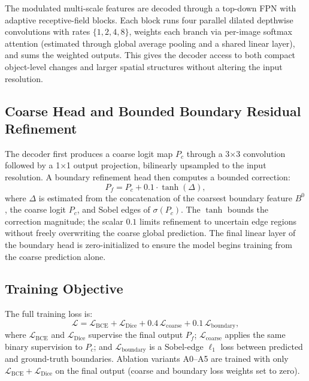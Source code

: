 The modulated multi-scale features are decoded through a top-down FPN with adaptive receptive-field blocks. Each block runs four parallel dilated depthwise convolutions with rates $\{1,2,4,8\}$, weights each branch via per-image softmax attention (estimated through global average pooling and a shared linear layer), and sums the weighted outputs. This gives the decoder access to both compact object-level changes and larger spatial structures without altering the input resolution.

\subsection{Coarse Head and Bounded Boundary Residual Refinement}
\label{sec:refinement}
The decoder first produces a coarse logit map $P_c$ through a 3$\times$3 convolution followed by a 1$\times$1 output projection, bilinearly upsampled to the input resolution. A boundary refinement head then computes a bounded correction:
\begin{equation}
    P_f = P_c + 0.1 \cdot \tanh(\Delta),
\end{equation}
where $\Delta$ is estimated from the concatenation of the coarsest boundary feature $B^0$, the coarse logit $P_c$, and Sobel edges of $\sigma(P_c)$. The $\tanh$ bounds the correction magnitude; the scalar $0.1$ limits refinement to uncertain edge regions without freely overwriting the coarse global prediction. The final linear layer of the boundary head is zero-initialized to ensure the model begins training from the coarse prediction alone.

\subsection{Training Objective}
\label{sec:loss}
The full training loss is:
\begin{equation}
    \mathcal{L} = \mathcal{L}_{\mathrm{BCE}} + \mathcal{L}_{\mathrm{Dice}}
                + 0.4\,\mathcal{L}_{\mathrm{coarse}}
                + 0.1\,\mathcal{L}_{\mathrm{boundary}},
\end{equation}
where $\mathcal{L}_{\mathrm{BCE}}$ and $\mathcal{L}_{\mathrm{Dice}}$ supervise the final output $P_f$; $\mathcal{L}_{\mathrm{coarse}}$ applies the same binary supervision to $P_c$; and $\mathcal{L}_{\mathrm{boundary}}$ is a Sobel-edge $\ell_1$ loss between predicted and ground-truth boundaries. Ablation variants A0--A5 are trained with only $\mathcal{L}_{\mathrm{BCE}} + \mathcal{L}_{\mathrm{Dice}}$ on the final output (coarse and boundary loss weights set to zero).
